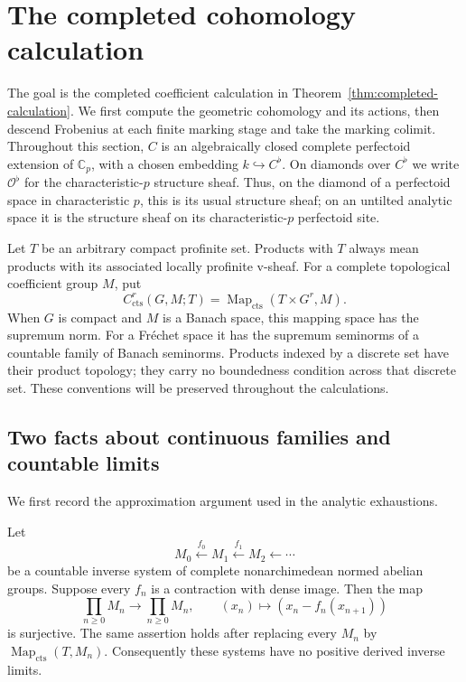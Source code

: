 \section{The completed cohomology calculation}
\label{sec:analytic}

The goal is the completed coefficient calculation in
Theorem~\ref{thm:completed-calculation}.  We first compute the geometric
cohomology and its actions, then descend Frobenius at each finite marking
stage and take the marking colimit.  Throughout this section, \(C\) is an
algebraically closed complete perfectoid extension of \(\mathbb C_p\),
with a chosen embedding \(k\hookrightarrow C^\flat\).  On diamonds over
\(C^\flat\) we write \(\mathcal O^\flat\) for the characteristic-\(p\)
structure sheaf.  Thus, on the diamond of a perfectoid space in
characteristic \(p\), this is its usual structure sheaf; on an untilted
analytic space it is the structure sheaf on its characteristic-\(p\)
perfectoid site.

Let \(T\) be an arbitrary compact profinite set.  Products with \(T\)
always mean products with its associated locally profinite v-sheaf.
For a complete topological coefficient group \(M\), put
\[
 C^r_{\mathrm{cts}}(G,M;T)
   =\operatorname{Map}_{\mathrm{cts}}(T\times G^r,M).
\]
When \(G\) is compact and \(M\) is a Banach space, this mapping space has
the supremum norm.  For a Fr\'echet space it has the supremum seminorms
of a countable family of Banach seminorms.  Products indexed by a
discrete set have their product topology; they carry no boundedness
condition across that discrete set.  These conventions will be
preserved throughout the calculations.

\subsection{Two facts about continuous families and countable limits}

We first record the approximation argument used in the analytic
exhaustions.

\begin{samepage}
\begin{lemma}
\label{lem:analytic-roos}
Let
\[
 M_0 \xleftarrow{f_0} M_1 \xleftarrow{f_1} M_2
       \xleftarrow{} \cdots
\]
be a countable inverse system of complete nonarchimedean normed
abelian groups.  Suppose every \(f_n\) is a contraction with dense
image.  Then the map
\begin{equation}
 \prod_{n\geq0}M_n\longrightarrow\prod_{n\geq0}M_n,\qquad
 (x_n)\longmapsto(x_n-f_n(x_{n+1}))
 \label{eq:analytic-roos}
\end{equation}
is surjective.  The same assertion holds after replacing every \(M_n\)
by \(\operatorname{Map}_{\mathrm{cts}}(T,M_n)\).
Consequently these systems have no positive derived inverse limits.
\end{lemma}
\end{samepage}

